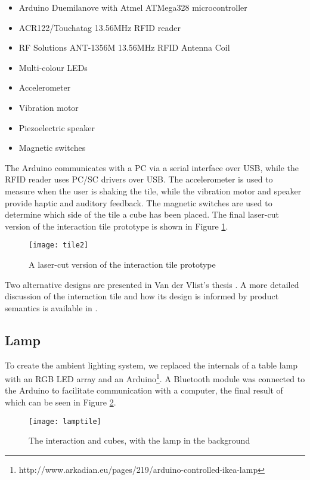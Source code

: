 \begin{itemize}
	\item Arduino Duemilanove with Atmel ATMega328 microcontroller
	\item ACR122/Touchatag 13.56MHz \ac{RFID} reader
	\item RF Solutions ANT-1356M 13.56MHz \ac{RFID} Antenna Coil
	\item Multi-colour LEDs
	\item Accelerometer 
	\item Vibration motor
	\item Piezoelectric speaker
	\item Magnetic switches
\end{itemize}

The Arduino communicates with a PC via a serial interface over USB, while the \ac{RFID} reader uses \ac{PC/SC} drivers over USB. The accelerometer is used to measure when the user is shaking the tile, while the vibration motor and speaker provide haptic and auditory feedback. The magnetic switches are used to determine which side of the tile a cube has been placed. The final laser-cut version of the interaction tile prototype is shown in Figure \ref{tile2}.

\begin{figure}[bth]
\centering
\texttt{[image: tile2]}
\caption{A laser-cut version of the interaction tile prototype}
\label{tile2}
\end{figure}

Two alternative designs are presented in Van der Vlist's thesis \cite{Bram}. A more detailed discussion of the interaction tile and how its design is informed by product semantics is available in \cite{VanderVlist2010}. 

\subsection{Lamp}
\label{Lamp}
To create the ambient lighting system, we replaced the internals of a table lamp with an RGB LED array and an Arduino\footnote{ http://www.arkadian.eu/pages/219/arduino-controlled-ikea-lamp}. A Bluetooth module was connected to the Arduino to facilitate communication with a computer, the final result of which can be seen in Figure \ref{lamptile}. 

\begin{figure}[bth]
\centering
\texttt{[image: lamptile]}
\caption{The interaction and cubes, with the lamp in the background}
\label{lamptile}
\end{figure}

